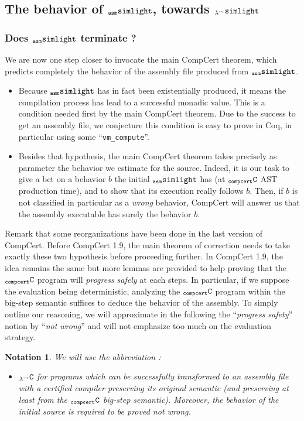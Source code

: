 \documentclass[a4paper, 11pt]{article}
\newcommand{\compcert}{CompCert 1.9\xspace}
\newcommand{\ccert}{CompCert\xspace}
\newcommand{\aSL}{$_{\tt asm}{\tt simlight}$\xspace} %
\newcommand{\lSL}{$_{\lambda^\leadsto}{\tt simlight}$\xspace}
\newcommand{\C}{$_{\tt compcert}{\tt C}$\xspace}
\newcommand{\lC}{$_{\lambda^\leadsto}{\tt C}$\xspace}
\newtheorem*{note}{Notation}
\begin{document}
\subsection{The behavior of \aSL, towards \lSL}
\subsubsection{Does \aSL terminate ?}
We are now one step closer to invocate the main \ccert theorem, which predicts completely the behavior of the assembly file produced from \aSL. 
\begin{itemize}
\item Because \aSL has in fact been existentially produced, it means the compilation process has lead to a successful monadic value. This is a condition needed first by the main \ccert theorem. Due to the success to get an assembly file, we conjecture this condition is easy to prove in Coq, in particular using some ``\verb|vm_compute|''. 
\item Besides that hypothesis, the main \ccert theorem takes precisely as parameter the behavior we estimate for the source. Indeed, it is our task to give a bet on a behavior $b$ the initial \aSL has (at \C AST production time), and to show that its execution really follows $b$. Then, if $b$ is not classified in particular as a \emph{wrong} behavior, \ccert will answer us that the assembly executable has surely the behavior $b$.
\end{itemize}

Remark that some reorganizations have been done in the last version of \ccert. Before \compcert, the main theorem of correction needs to take exactly these two hypothesis before proceeding further. In \compcert, the idea remains the same but more lemmas are provided to help proving that the \C program will \emph{progress safely} at each steps. In particular, if we suppose the evaluation being deterministic, analyzing the \C program within the big-step semantic suffices to deduce the behavior of the assembly. To simply outline our reasoning, we will approximate in the following the ``\emph{progress safety}'' notion by ``\emph{not wrong}'' and will not emphasize too much on the evaluation strategy.

\begin{note}
We will use the abbreviation :
\begin{itemize}
\item \lC for programs which can be successfully transformed to an assembly file with a certified compiler preserving its original semantic (and preserving at least from the \C big-step semantic). Moreover, the behavior of the initial source is required to be proved \emph{not wrong}.
\end{itemize}
\end{note}
\end{document}
